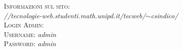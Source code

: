 \documentclass[12pt]{article}
\begin{document}
\begin{titlepage}
		
		\textsc{\Large Informazioni sul sito:}\\[0.3cm]	
		\textit{//tecnologie-web.studenti.math.unipd.it/tecweb/$\sim$csindico/}\\[1cm]
		
		
			\textsc{\Large Login Admin:}\\[0.3cm]
			\textsc{ Username:}\textit{ admin }\\[0.1mm]
			\textsc{ Password:}\textit{ admin }\\[0.1mm]
			
		\vfill
	\end{titlepage}
	
	\newpage
	\renewcommand{\contentsname}{Indice}
	\tableofcontents
	
	
	\newpage
	
\end{document}
